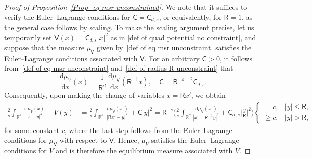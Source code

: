 \documentclass{amsart}
\def\R{\mathbb{R}}
\newcommand{\ud}{\, \mathrm{d}}
\theoremstyle{plain}
\theoremstyle{remark}
\numberwithin{equation}{section}
\begin{document}
\begin{proof}[Proof of Proposition~\ref{Prop_eq msr unconstrained}]
We note that it suffices to verify the Euler--Lagrange conditions for $\mathsf{C}=\mathsf{C}_{d,s}$, or equivalently, for $\mathsf{R}=1$, as the general case follows by scaling. 
To make the scaling argument precise, let us temporarily set $\mathsf{V}(x) =\mathsf{C}_{d,s}|x|^2$ as in \eqref{def of quad potential no constraint}, and suppose that the measure $\mu_{\mathsf{V}}$ given by~\eqref{def of eq msr unconstraint} satisfies the Euler--Lagrange conditions associated with $\mathsf{V}$. For an arbitrary $\mathsf{C}>0$, it follows from~\eqref{def of eq msr unconstraint} and~\eqref{def of radius R unconstraint} that
\[
    \frac{\ud\mu_V}{\ud x}(x) =\frac{1}{\mathsf{R}^d}\frac{\ud\mu_\mathsf{V}}{\ud x}(\mathsf{R}^{-1}x), \quad \mathsf{C}= \mathsf{R}^{-s-2} \mathsf{C}_{d,s}.
\]
Consequently, upon making the change of variables $x=\mathsf{R}x'$, we obtain 
\begin{align*}
    \frac{2}{s}\int_{\R^d} \frac{\ud \mu_V(x)}{|x-y|^s} +V(y) &= \frac{2}{s}\int_{\R^d} \frac{\ud\mu_\mathsf{V}(x')}{|\mathsf{R} x'-y|^s} + \mathsf{C} |y|^2 = \mathsf{R}^{-s}\bigg(\frac{2}{s}\int_{\R^d} \frac{\ud\mu_\mathsf{V}(x')}{|x'- \mathsf{R}^{-1}y|^s} + \mathsf{C}_{d,s}\Big|\frac{y}{\mathsf{R}}\Big|^2\bigg)
    \begin{cases}
        =c, &|y|\le \mathsf{R},\\
        \ge c, & |y|>\mathsf{R},
    \end{cases}
\end{align*}
for some constant $c$, where the last step follows from the Euler--Lagrange conditions for $\mu_{\mathsf{V}}$ with respect to $\mathsf{V}$. Hence, $\mu_V$ satisfies the Euler--Lagrange conditions for $V$ and is therefore the equilibrium measure associated with $V$.

 


\end{proof}
\end{document}

